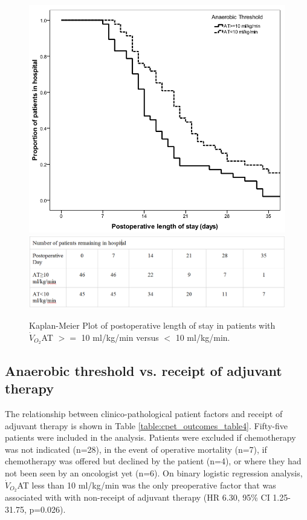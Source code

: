 \begin{figure}[p]
\centering
\includegraphics[width=\textwidth]{Figures/cpet_outcomes_km_at_los}
\includegraphics[width=\textwidth]{Figures/cpet_outcomes_km_at_los_table} %
\caption{Kaplan-Meier Plot of postoperative length of stay in patients with $\dot{V}_{O_2}$AT $>=$ 10 ml/kg/min versus $<$ 10 ml/kg/min.}
\label{fig:cpet_outcomes_km_at_los}
\end{figure}

\subsection{Anaerobic threshold vs. receipt of adjuvant therapy}
The relationship between clinico-pathological patient factors and receipt of adjuvant therapy is shown in Table \ref{table:cpet_outcomes_table4}. 
Fifty-five patients were included in the analysis. 
Patients were excluded if chemotherapy was not indicated (n=28), in the event of operative mortality (n=7), if chemotherapy was offered but declined by the patient (n=4), or where they had not been seen by an oncologist yet (n=6). 
On binary logistic regression analysis, $\dot{V}_{O_2}$AT less than 10 ml/kg/min was the only preoperative factor that was associated with with non-receipt of adjuvant therapy (HR 6.30, 95\% CI 1.25-31.75, p=0.026). 

